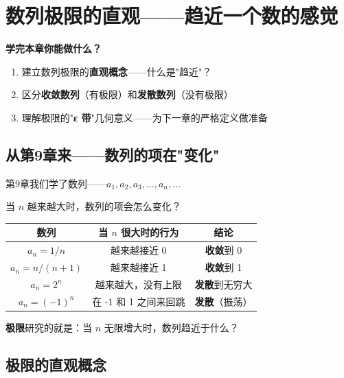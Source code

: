 
\chapter{数列极限的直观——趋近一个数的感觉}

\begin{applicationbox}
\textbf{学完本章你能做什么？}
\begin{enumerate}
  \item 建立数列极限的\textbf{直观概念}——什么是"趋近"？
  \item 区分\textbf{收敛数列}（有极限）和\textbf{发散数列}（没有极限）
  \item 理解极限的"\textbf{ε 带}"几何意义——为下一章的严格定义做准备
\end{enumerate}
\end{applicationbox}


\section{从第9章来——数列的项在"变化"}

第9章我们学了数列——\(a_1, a_2, a_3, \ldots, a_n, \ldots\)

当 \(n\) 越来越大时，数列的项会怎么变化？

\begin{center}
\begin{tabular}{c|c|c}
\textbf{数列} & \textbf{当 \(n\) 很大时的行为} & \textbf{结论} \\
\hline
\(a_n = 1/n\) & 越来越接近 0 & \textbf{收敛}到 0 \\
\(a_n = n/(n+1)\) & 越来越接近 1 & \textbf{收敛}到 1 \\
\(a_n = 2^n\) & 越来越大，没有上限 & \textbf{发散}到无穷大 \\
\(a_n = (-1)^n\) & 在 -1 和 1 之间来回跳 & \textbf{发散}（振荡） \\
\end{tabular}
\end{center}

\textbf{极限}研究的就是：当 \(n\) 无限增大时，数列趋近于什么？


\section{极限的直观概念}

